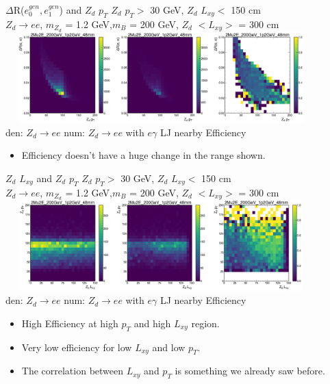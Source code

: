 \documentclass{beamer}
\begin{document}
\begin{frame}[noframenumbering,t]{$\Delta$R($e^{gen}_0, e^{gen}_1$) and $Z_d$ $p_T$ }
\centering
$Z_d$ $p_T>$ 30 GeV, $Z_d$ $L_{xy}<$ 150 cm\\
\scriptsize
\textcolor{UniBlue}{$Z_d \rightarrow ee$}, \textcolor{uvaorange}{$m_{Z_d}$ = 1.2 GeV,$m_B$ = 200 GeV, $Z_d$ $<L_{xy}>$ = 300 cm}\\
\centering
\includegraphics[width =12cm, height =3.5cm]{zd_ee_pt_dR_1p2.png}\\
{\tiny \textcolor{uvaorange}{\hspace{-1cm}den: $Z_d\rightarrow ee$ \hspace{2.5cm } num: $Z_d\rightarrow ee$ with  $e\gamma$ LJ nearby\hspace{2cm} Efficiency\\}}
\normalsize
\begin{itemize}
    \item Efficiency doesn't have a huge change in the range shown.
\end{itemize}
    
\end{frame}
\begin{frame}[noframenumbering,t]{ $Z_d$ $L_{xy}$ and $Z_d$ $p_T$ }
\centering
$Z_d$ $p_T>$ 30 GeV, $Z_d$ $L_{xy}<$ 150 cm\\
\scriptsize
\textcolor{UniBlue}{$Z_d \rightarrow ee$}, \textcolor{uvaorange}{$m_{Z_d}$ = 1.2 GeV,$m_B$ = 200 GeV, $Z_d$ $<L_{xy}>$ = 300 cm}\\
\centering
\includegraphics[width =12cm, height =3.5cm]{zd_ee_lxy_pT_1p2.png}\\
{\tiny \textcolor{uvaorange}{\hspace{-1cm}den: $Z_d\rightarrow ee$ \hspace{2.5cm } num: $Z_d\rightarrow e e$ with  $e\gamma$ LJ nearby\hspace{2cm} Efficiency\\}}
\normalsize
\begin{itemize}
    \item High Efficiency at high $p_T$ and high $L_{xy}$ region.
    \item Very low efficiency for low $L_{xy}$ and low $p_T$. 
    \item The correlation between $L_{xy}$ and $p_T$ is something we already saw before.
\end{itemize}
\end{frame}
\end{document}
